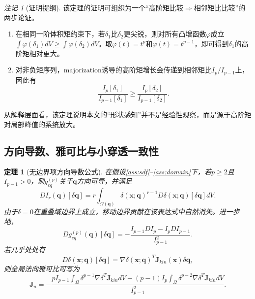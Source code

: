 ﻿\documentclass[12pt, a4paper]{ctexart}
\theoremstyle{plain}
\newtheorem{theorem}{定理}
\theoremstyle{remark}
\newtheorem{remark}{注记}
\begin{document}
\begin{remark}[证明提纲]
该定理的证明可组织为一个“高阶矩比较$ \Rightarrow $相邻矩比比较”的两步论证。
\begin{enumerate}
    \item 在相同一阶体积矩约束下，若$\delta_1$比$\delta_2$更尖锐，则对所有凸增函数$\varphi$成立$\int \varphi(\delta_1) dV \ge \int \varphi(\delta_2) dV$。取$\varphi(t) = t^p$和$\varphi(t) = t^{p-1}$，即可得到$\delta_1$的高阶矩相对更大。
    \item 对非负矩序列，majorization诱导的高阶矩增长会传递到相邻矩比$I_p/I_{p-1}$上，因此有
    \begin{equation}
        \frac{I_p[\delta_1]}{I_{p-1}[\delta_1]} \ge \frac{I_p[\delta_2]}{I_{p-1}[\delta_2]}.
    \end{equation}
\end{enumerate}
从解释层面看，该定理说明本文的“形状感知”并不是经验性观察，而是源于高阶矩对局部峰值的系统放大。
\end{remark}

\subsection{方向导数、雅可比与小穿透一致性}
\begin{theorem}[无边界项方向导数公式]\label{thm:jac}
在假设\ref{ass:sdf}--\ref{ass:domain}下，若$p \ge 2$且$I_{p-1} > 0$，则$g_{eq}^{(p)}$关于$\bm{q}$方向可导，并满足
\begin{equation}
    D I_r(\bm{q})[\delta \bm{q}] = r \int_{\Omega(\bm{q})} \delta(\bm{x};\bm{q})^{r-1} D \delta(\bm{x};\bm{q})[\delta \bm{q}] dV .
\end{equation}
由于$\delta = 0$在重叠域边界上成立，移动边界贡献在该表达式中自然消失。进一步地，
\begin{equation}\label{eq:jac_general}
    D g_{eq}^{(p)}(\bm{q})[\delta \bm{q}] = - \frac{ I_{p-1} D I_p - I_p D I_{p-1} }{ I_{p-1}^2 } .
\end{equation}
若几乎处处有
\begin{equation}
    D \delta(\bm{x};\bm{q})[\delta \bm{q}] = \nabla \delta(\bm{x};\bm{q})^T \bm{J}_{kin}(\bm{x}) \delta \bm{q},
\end{equation}
则全局法向雅可比可写为
\begin{equation}\label{eq:Jn_new}
    \bm{J}_n = - \frac{ p I_{p-1} \displaystyle\int_{\Omega} \delta^{p-1} \nabla \delta^T \bm{J}_{kin} dV - (p-1) I_p \displaystyle\int_{\Omega} \delta^{p-2} \nabla \delta^T \bm{J}_{kin} dV }{I_{p-1}^2}.
\end{equation}
\end{theorem}
\end{document}
